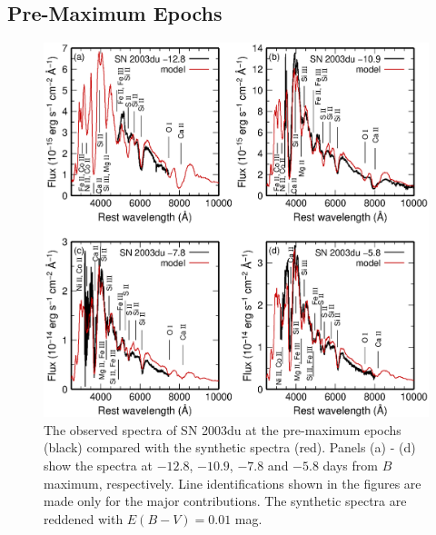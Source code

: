 \documentclass[usegraphicx,usenatbib]{mn2e}
\begin{document}
\subsection{Pre-Maximum Epochs}

\begin{figure}
  \includegraphics[scale=0.7]{f2.eps}
  \caption{
The observed spectra of SN 2003du at the pre-maximum epochs (black) compared
with the synthetic spectra (red). Panels (a) - (d) show the spectra at $-12.8$,
$-10.9$, $-7.8$ and $-5.8$ days from $B$ maximum, respectively. Line
identifications shown in the figures are made only for the major contributions.
The synthetic spectra are reddened with $E(B-V)=0.01$ mag.
}
\label{fig:spec1}
\end{figure}
\end{document}
